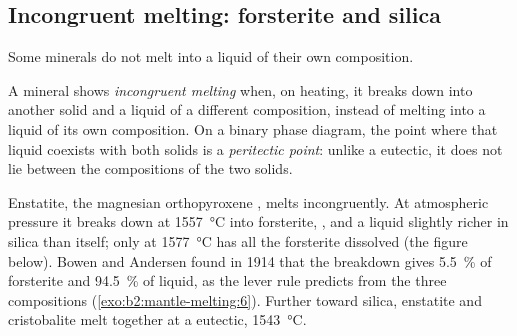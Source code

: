 \subsection*{Incongruent melting: forsterite and silica}

Some minerals do not melt into a liquid of their own composition.

\begin{definition}\label{def:b2:mantle-melting:peritectic}
A mineral shows \emph{incongruent melting} when, on
heating, it breaks down into another solid and a liquid of a different
composition, instead of melting into a liquid of its own composition. On a binary
phase diagram, the point where that liquid coexists with both solids is a
\emph{peritectic point}: unlike a eutectic, it does not lie
between the compositions of the two solids.
\end{definition}

Enstatite, the magnesian orthopyroxene , melts incongruently. At
atmospheric pressure it breaks down at \qty{1557}{\celsius} into forsterite,
, and a liquid slightly richer in silica than itself; only at
\qty{1577}{\celsius} has all the forsterite dissolved (the figure below). Bowen
and Andersen found in 1914 that the breakdown gives \qty{5.5}{\percent} of
forsterite and \qty{94.5}{\percent} of liquid, as the lever rule predicts from
the three compositions (\cref{exo:b2:mantle-melting:6}). Further toward silica, enstatite and
cristobalite melt together at a eutectic, \qty{1543}{\celsius}.

